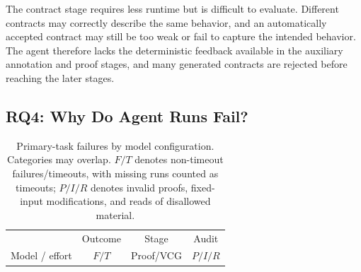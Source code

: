 The contract stage requires less runtime but is difficult to evaluate. Different contracts may correctly describe the same behavior, and an automatically accepted contract may still be too weak or fail to capture the intended behavior. The agent therefore lacks the deterministic feedback available in the auxiliary annotation and proof stages, and many generated contracts are rejected before reaching the later stages.

\subsection{RQ4: Why Do Agent Runs Fail?}
\begin{table}[t]
    \centering
    \caption{Primary-task failures by model configuration. Categories may overlap. $F/T$ denotes non-timeout failures/timeouts, with missing runs counted as timeouts; $P/I/R$ denotes invalid proofs, fixed-input modifications, and reads of disallowed material.}
    \label{tab:error_analysis_models}
    \scriptsize
    \setlength{\tabcolsep}{3.2pt}
    \renewcommand{\arraystretch}{1.02}
    \begin{tabular}{@{}lccc@{}}
        \toprule
        \rowcolor{benchmarkhead}
        & Outcome & Stage & Audit \\
        \rowcolor{benchmarkhead}
        Model / effort & $F/T$ & Proof/VCG & $P/I/R$ \\
        \midrule
        
    \end{tabular}
\end{table}




